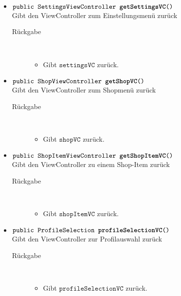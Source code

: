 \begin{description}
\begin{itemize}
		\item $\texttt{public SettingsViewController \textbf{getSettingsVC}()}$ \\ Gibt den ViewController zum Einstellungsmenü zurück
		\begin{description}
			\item[Rückgabe] \hfill \\
			\vspace{-.8cm}
			\begin{itemize}
				\item Gibt $\texttt{settingsVC}$ zurück.
			\end{itemize}
			\end{description}
			
		\item $\texttt{public ShopViewController \textbf{getShopVC}()}$ \\ Gibt den ViewController zum Shopmenü zurück
		\begin{description}
			\item[Rückgabe] \hfill \\
			\vspace{-.8cm}
			\begin{itemize}
				\item Gibt $\texttt{shopVC}$ zurück.
			\end{itemize}
			\end{description}
			
		\item $\texttt{public ShopItemViewController \textbf{getShopItemVC}()}$ \\ Gibt den ViewController zu einem Shop-Item zurück
			\begin{description}
			\item[Rückgabe] \hfill \\
			\vspace{-.8cm}
			\begin{itemize}
				\item Gibt $\texttt{shopItemVC}$ zurück.
			\end{itemize}
		\end{description}
			
		\item $\texttt{public ProfileSelection \textbf{profileSelectionVC}()}$ \\ Gibt den ViewController zur Profilauswahl zurück
			\begin{description}
			\item[Rückgabe] \hfill \\
			\vspace{-.8cm}
			\begin{itemize}
				\item Gibt $\texttt{profileSelectionVC}$ zurück.
			\end{itemize}
		\end{description}
		

\end{itemize}
\end{description}

